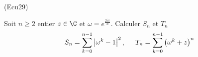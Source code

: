 \begin{tiny}(Ecu29)\end{tiny} Soit $n\geq 2$ entier $z\in \C$ et $\omega = e^{\frac{2i\pi}{n}}$. Calculer $S_n$ et $T_n$
\begin{displaymath}
 S_n =
 \sum_{k=0}^{n-1}\left|\omega^k - 1\right|^2, \hspace{0.5cm}
 T_n = 
 \sum_{k=0}^{n-1}\left( \omega^k +z\right)^n
\end{displaymath}
